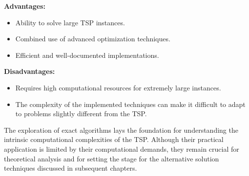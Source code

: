 \textbf{Advantages:}
\begin{itemize}
    \item Ability to solve large \Gls{TSP} instances.
    \item Combined use of advanced optimization techniques.
    \item Efficient and well-documented implementations.
\end{itemize}

\textbf{Disadvantages:}
\begin{itemize}
    \item Requires high computational resources for extremely large instances.
    \item The complexity of the implemented techniques can make it difficult to adapt to problems slightly different from the \Gls{TSP}.
\end{itemize}


The exploration of exact algorithms lays the foundation for understanding the intrinsic computational complexities of the \Gls{TSP}. Although their practical application is limited by their computational demands, they remain crucial for theoretical analysis and for setting the stage for the alternative solution techniques discussed in subsequent chapters.

